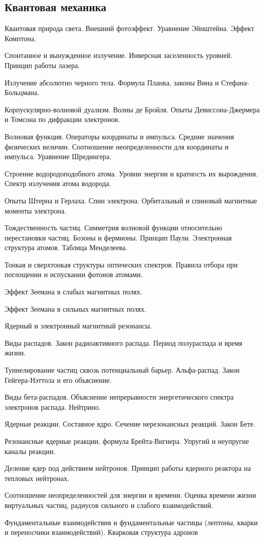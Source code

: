 \subsection*{Квантовая механика}
\begin{enumerate*}
\setcounter{enumi}{43}
\item Квантовая природа света. Внешний фотоэффект. Уравнение Эйнштейна. Эффект Комптона.
\item Спонтанное и вынужденное излучение. Инверсная заселенность уровней. Принцип работы лазера.
\item Излучение абсолютно черного тела. Формула Планка, законы Вина и Стефана-Больцмана.
\item Корпускулярно-волновой дуализм. Волны де Бройля. Опыты Девиссона-Джермера и Томсона по
дифракции электронов.
\item Волновая функция. Операторы координаты и импульса. Средние значения физических величин.
Соотношение неопределенности для координаты и импульса. Уравнение Шредингера.
\item Строение водородоподобного атома. Уровни энергии и кратность их вырождения. Спектр излучения атома водорода.
\item Опыты Штерна и Герлаха. Спин электрона. Орбитальный и спиновый магнитные моменты электрона.
\item Тождественность частиц. Симметрия волновой функции относительно перестановки частиц. Бозоны и фермионы. Принцип Паули. Электронная структура атомов. Таблица Менделеева.
\item Тонкая и сверхтонкая структуры оптических спектров. Правила отбора при поглощении и испускании фотонов атомами.
\item Эффект Зеемана в слабых магнитных полях.
\item Эффект Зеемана в сильных магнитных полях.
\item Ядерный и электронный магнитный резонансы.
\item Виды распадов. Закон радиоактивного распада. Период полураспада и время жизни.
\item Туннелирование частиц сквозь потенциальный барьер. Альфа-распад. Закон Гейгера-Нэттола и его
объяснение.
\item Виды бета-распадов. Объяснение непрерывности энергетического спектра электронов распада.
Нейтрино.
\item Ядерные реакции. Составное ядро. Сечение нерезонансных реакций. Закон Бете.
\item Резонансные ядерные реакции, формула Брейта-Вигнера. Упругий и неупругие каналы реакции.
\item Деление ядер под действием нейтронов. Принцип работы ядерного реактора на тепловых нейтронах.
\item Соотношение неопределенностей для энергии и времени. Оценка времени жизни виртуальных частиц, радиусов сильного и слабого взаимодействий.
\item Фундаментальные взаимодействия и фундаментальные частицы (лептоны, кварки и переносчики
взаимодействий). Кварковая структура адронов
\end{enumerate*}